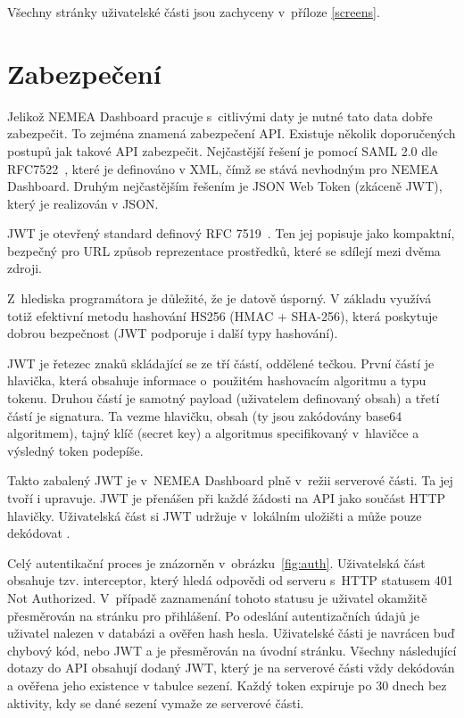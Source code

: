 Všechny stránky uživatelské části jsou zachyceny v~příloze \ref{screens}.

\section{Zabezpečení}
\label{zabezpeceni}

Jelikož NEMEA Dashboard pracuje s~citlivými daty je nutné tato data dobře zabezpečit. To zejména znamená zabezpečení API. Existuje několik doporučených postupů jak takové API zabezpečit. Nejčastější řešení je pomocí SAML 2.0 dle RFC7522~\cite{rfc:saml}, které je definováno v XML, čímž se stává nevhodným pro NEMEA Dashboard. Druhým nejčastějším řešením je JSON Web Token (zkáceně JWT), který je realizován v JSON.

JWT je otevřený standard definový RFC 7519~\cite{rfc:jwt}. Ten jej popisuje jako kompaktní, bezpečný pro URL způsob reprezentace prostředků, které se sdílejí mezi dvěma zdroji.

Z~hlediska programátora je důležité, že je datově úsporný. V základu využívá totiž efektivní metodu hashování HS256 (HMAC + SHA-256), která poskytuje dobrou bezpečnost (JWT podporuje i další typy hashování).

JWT je řetezec znaků skládající se ze tří částí, oddělené tečkou. První částí je hlavička, která obsahuje informace o~použitém hashovacím algoritmu a typu tokenu. Druhou částí je samotný payload (uživatelem definovaný obsah) a třetí částí je signatura. Ta vezme hlavičku, obsah (ty jsou zakódovány base64 algoritmem), tajný klíč (secret key) a algoritmus specifikovaný v~hlavičce a výsledný token podepíše.

Takto zabalený JWT je v~NEMEA Dashboard plně v~režii serverové části. Ta jej tvoří i upravuje. JWT je přenášen při každé žádosti na API jako součást HTTP hlavičky. Uživatelská část si JWT udržuje v~lokálním uložišti a může pouze dekódovat .

Celý autentikační proces je znázorněn v~obrázku~\ref{fig:auth}. Uživatelská část obsahuje tzv. interceptor, který hledá odpovědi od serveru s~HTTP statusem 401 Not Authorized. V~případě zaznamenání tohoto statusu je uživatel okamžitě přesměrován na stránku pro přihlášení. Po odeslání autentizačních údajů je uživatel nalezen v databázi a ověřen hash hesla. Uživatelské části je navrácen buď chybový kód, nebo JWT a je přesměrován na úvodní stránku. Všechny následující dotazy do API obsahují dodaný JWT, který je na serverové části vždy dekódován a ověřena jeho existence v tabulce sezení. Každý token expiruje po 30 dnech bez aktivity, kdy se dané sezení vymaže ze serverové části.

